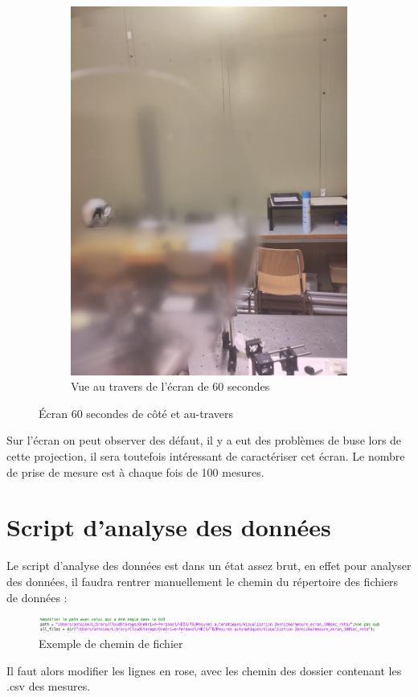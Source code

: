 \begin{figure}[H]
\begin{subfigure}{.5\textwidth}
        \includegraphics[width=1\linewidth]{assets/figures/mesures/60_sec_travers.jpeg}
        \caption{Vue au travers de l'écran de 60 secondes}
    \end{subfigure}
    \caption{Écran 60 secondes de côté et au-travers}
\end{figure}
Sur l'écran on peut observer des défaut, il y a eut des problèmes de buse lors de cette projection, il sera toutefois
intéressant de caractériser cet écran. Le nombre de prise de mesure est à chaque fois de 100 mesures.

\section{Script d'analyse des données}
Le script d'analyse des données est dans un état assez brut, en effet pour analyser des données, il faudra rentrer manuellement
le chemin du répertoire des fichiers de données :
\begin{figure}[H]
    \centering
    \includegraphics[width = 1\textwidth]{assets/figures/mesures/exemple_chemin_fichier.png}
    \caption{Exemple de chemin de fichier}
\end{figure}
Il faut alors modifier les lignes en rose, avec les chemin des dossier contenant les .csv des mesures.

